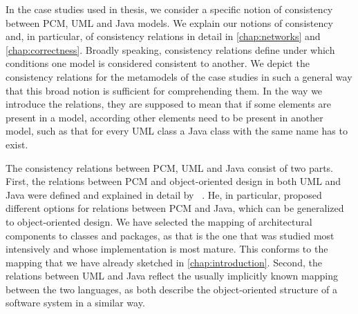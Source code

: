 






In the case studies used in thesis, we consider a specific notion of consistency between \gls{PCM}, \gls{UML} and Java models.
We explain our notions of consistency and, in particular, of consistency relations in detail in \autoref{chap:networks} and \autoref{chap:correctness}.
Broadly speaking, consistency relations define under which conditions one model is considered consistent to another.
We depict the consistency relations for the metamodels of the case studies in such a general way that this broad notion is sufficient for comprehending them.
In the way we introduce the relations, they are supposed to mean that if some elements are present in a model, according other elements need to be present in another model, such as that for every \gls{UML} class a Java class with the same name has to exist.

The consistency relations between \gls{PCM}, \gls{UML} and Java consist of two parts.
First, the relations between \gls{PCM} and object-oriented design in both \gls{UML} and Java were defined and explained in detail by \citeauthor{langhammer2017a}~\cite{langhammer2015a, langhammer2017a}.
He, in particular, proposed different options for relations between \gls{PCM} and Java, which can be generalized to object-oriented design.
We have selected the mapping of architectural components to classes and packages, as that is the one that was studied most intensively and whose implementation is most mature.
This conforms to the mapping that we have already sketched in \autoref{chap:introduction}.
Second, the relations between \gls{UML} and Java reflect the usually implicitly known mapping between the two languages, as both describe the object-oriented structure of a software system in a similar way.

